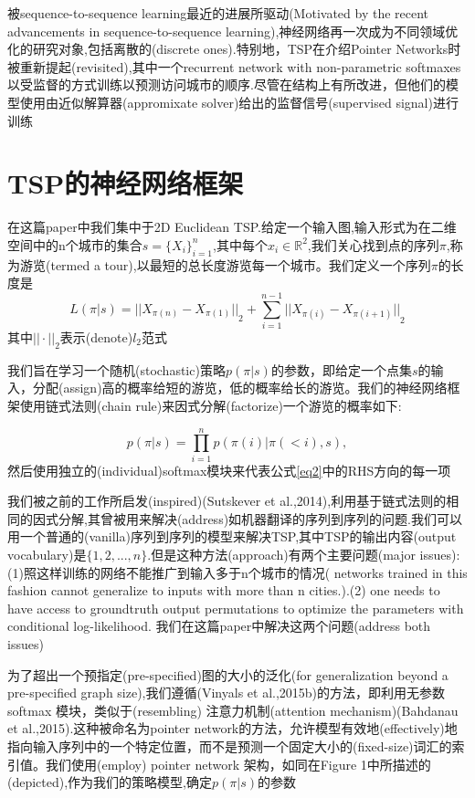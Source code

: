 \documentclass[a4paper,UTF8]{ctexart}
\theoremstyle{definition}
\begin{document}
被sequence-to-sequence learning最近的进展所驱动(Motivated by the recent advancements in sequence-to-sequence learning),神经网络再一次成为不同领域优化的研究对象,包括离散的(discrete ones).特别地，TSP在介绍Pointer Networks时被重新提起(revisited),其中一个recurrent network with non-parametric
softmaxes 以受监督的方式训练以预测访问城市的顺序.尽管在结构上有所改进，但他们的模型使用由近似解算器(appromixate solver)给出的监督信号(supervised signal)进行训练

\section{TSP的神经网络框架}
在这篇paper中我们集中于2D Euclidean TSP.给定一个输入图,输入形式为在二维空间中的n个城市的集合$s=\{{X_i}\}^n_{i=1}$,其中每个$x_i \in \mathbb{R}^2$,我们关心找到点的序列$\pi$,称为游览(termed a tour),以最短的总长度游览每一个城市。我们定义一个序列$\pi$的长度是
\begin{equation}
L(\pi | s)={||X_{\pi (n)}-X_{\pi (1)}||}_2+\sum_{i=1}^{n-1} {||X_{\pi (i)}-X_{\pi (i+1)}||}_2
\end{equation}
其中${||\cdot||}_2$表示(denote)$l_2$范式

我们旨在学习一个随机(stochastic)策略$p(\pi | s)$的参数，即给定一个点集$s$的输入，分配(assign)高的概率给短的游览，低的概率给长的游览。我们的神经网络框架使用链式法则(chain rule)来因式分解(factorize)一个游览的概率如下:

\begin{equation}\label{eq2}
p(\pi |s)=\prod_{i=1}^n p(\pi (i)| \pi (< i),s),
\end{equation}
然后使用独立的(individual)softmax模块来代表公式\eqref{eq2}中的RHS方向的每一项

我们被之前的工作所启发(inspired)(Sutskever et al.,2014),利用基于链式法则的相同的因式分解,其曾被用来解决(address)如机器翻译的序列到序列的问题.我们可以用一个普通的(vanilla)序列到序列的模型来解决TSP,其中TSP的输出内容(output vocabulary)是$\{1,2,...,n\}$.但是这种方法(approach)有两个主要问题(major issues):(1)照这样训练的网络不能推广到输入多于n个城市的情况( networks trained in this fashion cannot generalize to inputs with more than n cities.).(2) one needs to have access to groundtruth output permutations to optimize the parameters with conditional log-likelihood. 我们在这篇paper中解决这两个问题(address both issues)

为了超出一个预指定(pre-specified)图的大小的泛化(for generalization beyond a pre-specified graph size),我们遵循(Vinyals et al.,2015b)的方法，即利用无参数softmax 模块，类似于(resembling) 注意力机制(attention mechanism)(Bahdanau et al.,2015).这种被命名为pointer network的方法，允许模型有效地(effectively)地指向输入序列中的一个特定位置，而不是预测一个固定大小的(fixed-size)词汇的索引值。我们使用(employ) pointer network 架构，如同在Figure 1中所描述的(depicted),作为我们的策略模型,确定$p(\pi|s)$的参数
\end{document}
